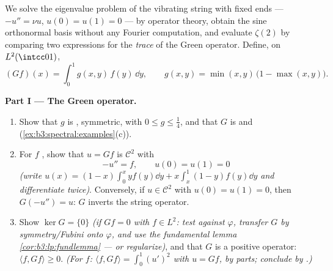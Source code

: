 \begin{problem}\label{pb:b3:spectral:1}
We solve the eigenvalue problem of the vibrating string with
fixed ends --- $-u'' = \nu u$, $u(0) = u(1) = 0$ --- by
operator theory, obtain the sine orthonormal basis without any
Fourier computation, and evaluate $\zeta(2)$ by comparing two
expressions for the \emph{trace} of the Green operator.
Define, on $L^2(\intcc01)$,
\[
(Gf)(x) = \int_0^1 g(x,y)\,f(y)\,\dd y,
\qquad
g(x, y) = \min(x,y)\,\bigl(1 - \max(x,y)\bigr).
\]

\medskip
\noindent\textbf{Part I --- The Green operator.}
\begin{enumerate}
  \item Show that $g$ is , symmetric, with $0 \leq g
        \leq \frac14$, and that $G$ is  and
         (\cref{ex:b3:spectral:examples}(c)).
  \item For $f$ , show that $u = Gf$ is $\mathcal
        C^2$ with
        \[
        -u'' = f, \qquad u(0) = u(1) = 0
        \]
        \emph{(write $u(x) = (1-x)\int_0^xyf(y)\dd y +
        x\int_x^1(1-y)f(y)\dd y$ and differentiate twice)}.
        Conversely, if $u \in \mathcal C^2$ with $u(0) = u(1)
        = 0$, then $G(-u'') = u$: $G$ inverts the string
        operator.
  \item Show $\ker G = \{0\}$ \emph{(if $Gf = 0$ with $f \in
        L^2$: test against  $\varphi$, transfer $G$
        by symmetry/Fubini onto $\varphi$, and use the
        fundamental lemma \cref{cor:b3:lp:fundlemma} --- or
        regularize)}, and that $G$ is a positive operator:
        $\langle f, Gf\rangle \geq 0$. \emph{(For 
        $f$: $\langle f, Gf\rangle = \int_0^1 (u')^2$ with $u
        = Gf$, by parts; conclude by .)}
\end{enumerate}


\end{problem}
